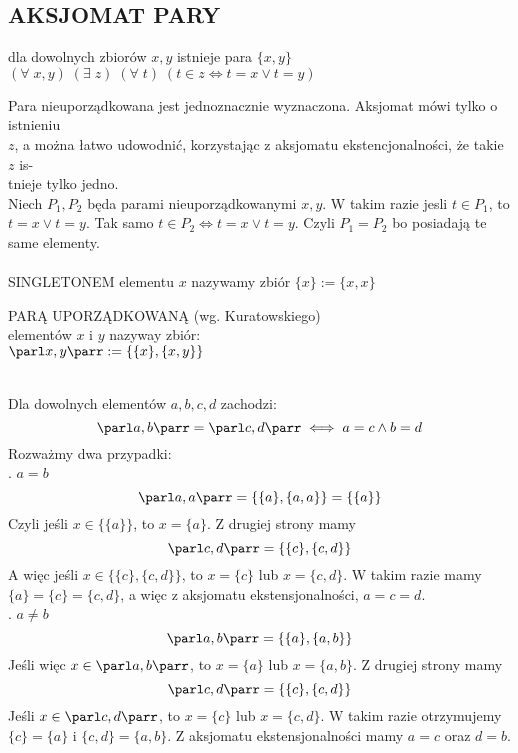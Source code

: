 \subsection{AKSJOMAT PARY}
\begin{center}\large
    dla dowolnych zbiorów $x, y$ istnieje para $\{x, y\}$\smallskip\\
    $(\forall\;x,y)\;(\exists\;z)\;(\forall\;t)\;(t\in z\iff t=x\lor t=y)$
\end{center}
{\color{acc}Para nieuporządkowana jest jednoznacznie wyznaczona}. Aksjomat mówi tylko o istnieniu \\$z$, a można łatwo udowodnić, korzystając z aksjomatu ekstencjonalności, że takie $z$ is-\\tnieje tylko jedno.\medskip\\
Niech $P_1, P_2$ będa parami nieuporządkowanymi $x, y$. W takim razie jesli $t\in P_1$, to $t=x\lor t=y$. Tak samo $t\in P_2\iff t=x\lor t=y$. Czyli $P_1=P_2$ bo posiadają te same elementy. \bigskip\\
\bigskip\\
{\color{def}SINGLETONEM} elementu $x$ nazywamy zbiór $\{x\}:=\{x, x\}$\bigskip
\begin{center}\large
    {\color{def}PARĄ UPORZĄDKOWANĄ} (wg. Kuratowskiego) \\elementów $x$ i $y$ nazyway zbiór:\smallskip\\
    $\parl x,y\parr := \{\{x\}, \{x,y\}\}$
\end{center}\medskip
{}\medskip\\
Dla dowolnych elementów $a, b, c, d$ zachodzi:
$$\parl a, b\parr = \parl c,d\parr \iff a=c\land b=d$$
\dowod
Rozważmy dwa przypadki:\medskip\\
. $a=b$\\
$$\parl a,a\parr = \{\{a\}, \{a, a\}\} = \{\{a\}\}$$
Czyli jeśli $x\in \{\{a\}\}$, to $x=\{a\}$. Z drugiej strony mamy 
$$\parl c, d\parr=\{\{c\}, \{c,d\}\}$$
A więc jeśli $x\in \{\{c\}, \{c,d\}\}$, to $x=\{c\}$ lub $x=\{c, d\}$. W takim razie mamy $\{a\}=\{c\}=\{c, d\}$, a więc z aksjomatu ekstensjonalności, $a=c=d$.\medskip\\
. $a\neq b$
$$\parl a, b\parr = \{\{a\}, \{a, b\}\}$$
Jeśli więc $x\in \parl a, b\parr$, to $x=\{a\}$ lub $x=\{a, b\}$. Z drugiej strony mamy
$$\parl c, d\parr=\{\{c\}, \{c, d\}\}$$
Jeśli $x\in \parl c,d\parr$, to $x=\{c\}$ lub $x=\{c, d\}$. W takim razie otrzymujemy $\{c\}=\{a\}$ i $\{c, d\}=\{a, b\}$. Z aksjomatu ekstensjonalności mamy $a=c$ oraz $d=b$.
\kondow
